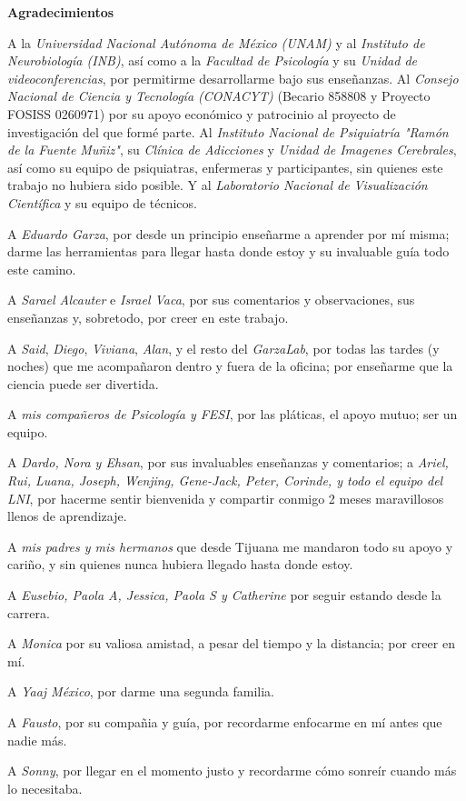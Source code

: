 \begin{center}
    \huge\textbf{Agradecimientos}
\end{center}

A la \emph{Universidad Nacional Autónoma de México (UNAM)} y al \emph{Instituto de Neurobiología (INB)}, así como a la \emph{Facultad de Psicología} y su \emph{Unidad de videoconferencias}, por permitirme desarrollarme bajo sus enseñanzas. Al \emph{Consejo Nacional de Ciencia y Tecnología (CONACYT)} (Becario {\textnumero} 858808 y Proyecto FOSISS {\textnumero} 0260971) por su apoyo económico y patrocinio al proyecto de investigación del que formé parte. Al \emph{Instituto Nacional de Psiquiatría "Ramón de la Fuente Muñiz"}, su \emph{Clínica de Adicciones} y \emph{Unidad de Imagenes Cerebrales}, así como su equipo de psiquiatras, enfermeras y participantes, sin quienes este trabajo no hubiera sido posible. Y al \emph{Laboratorio Nacional de Visualización Científica} y su equipo de técnicos.

A \emph{Eduardo Garza}, por desde un principio enseñarme a aprender por mí misma; darme las herramientas para llegar hasta donde estoy y su invaluable guía todo este camino.

A \emph{Sarael Alcauter} e \emph{Israel Vaca}, por sus comentarios y observaciones, sus enseñanzas y, sobretodo, por creer en este trabajo.

A \emph{Said}, \emph{Diego}, \emph{Viviana}, \emph{Alan}, y el resto del \emph{GarzaLab}, por todas las tardes (y noches) que me acompañaron dentro y fuera de la oficina; por enseñarme que la ciencia puede ser divertida.

A \emph{mis compañeros de Psicología y FESI}, por las pláticas, el apoyo mutuo; ser un equipo.

A \emph{Dardo, Nora y Ehsan}, por sus invaluables enseñanzas y comentarios; a \emph{Ariel, Rui, Luana, Joseph, Wenjing, Gene-Jack, Peter, Corinde, y todo el equipo del LNI}, por hacerme sentir bienvenida y compartir conmigo 2 meses maravillosos llenos de aprendizaje.

A \emph{mis padres y mis hermanos} que desde Tijuana me mandaron todo su apoyo y cariño, y sin quienes nunca hubiera llegado hasta donde estoy.

A \emph{Eusebio, Paola A, Jessica, Paola S y Catherine} por seguir estando desde la carrera.

A \emph{Monica} por su valiosa amistad, a pesar del tiempo y la distancia; por creer en mí.

A \emph{Yaaj México}, por darme una segunda familia.

A \emph{Fausto}, por su compañia y guía, por recordarme enfocarme en mí antes que nadie más.

A \emph{Sonny}, por llegar en el momento justo y recordarme cómo sonreír cuando más lo necesitaba.\newpage
